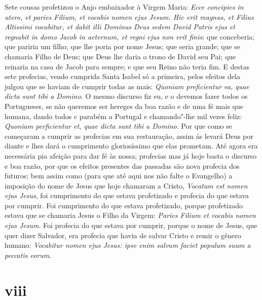 Sete cousas profetizou o Anjo embaixador à Virgem Maria: \emph{Ecce
concipies in utero, et paries Filium, et vocabis nomen ejus Jesum. Hic
erit magnus, et Filius Altissimi vocabitur, et dabit illi Dominus Deus
sedem David Patris ejus et regnabit in domo Jacob in aeternum, et regni
ejus non erit finis}: que conceberia; que pariria um filho; que lhe
poria por nome Jesus; que seria grande; que se chamaria Filho de Deus;
que Deus lhe daria o trono de David seu Pai; que reinaria na casa de
Jacob para sempre; e que seu Reino não teria fim. E destas sete
profecias, vendo cumprida Santa Isabel só a primeira, pelos efeitos dela
julgou que se haviam de cumprir todas as mais: \emph{Quoniam
preficientur ea, quae dicta sunt tibi a Domino}. O mesmo discurso fiz
eu, e o devemos fazer todos os Portugueses, se não queremos ser hereges
da boa razão e de uma fé mais que humana, dando todos c parabém a
Portugal e chamando"-lhe mil vezes feliz: \emph{Quoniam perficientur et,
quae dicta sunt tibi a Domino}. Por que como se começaram a cumprir as
profecias em sua restauração, assim ás levará Deus por diante e lhes
dará o cumprimento gloriosíssimo que elas prometam. Até agora era
necessária pia afeição para dar fé às nossa; profecias mas já hoje basta
o discurso e boa razão, por que os efeitos presentes das passadas são
nova profecia dos futuros; bem assim como (para que até aqui nos não
falte o Evangelho) a imposição do nome de Jesus que hoje chamaram a
Cristo, \emph{Vocatum est nomen ejus Jesus}, foi cumprimento do que
estava profetizado e profecia do que estava por cumprir. Foi cumprimento
do que estava profetizado, porque profetizado estava que se chamaria
Jesus o Filho da Virgem: \emph{Paries Filium et vocabis nomen ejus
Jesum}. Foi profecia do que estava por cumprir, porque o nome de Jesus,
que quer dizer Salvador, era profecia que havia de salvar Cristo e remir
o gênero humano: \emph{Vocabitur nomen ejus Jesus: ipse enim salvum
faciet populum suum a peccatis eorum}.

\section*{viii}

